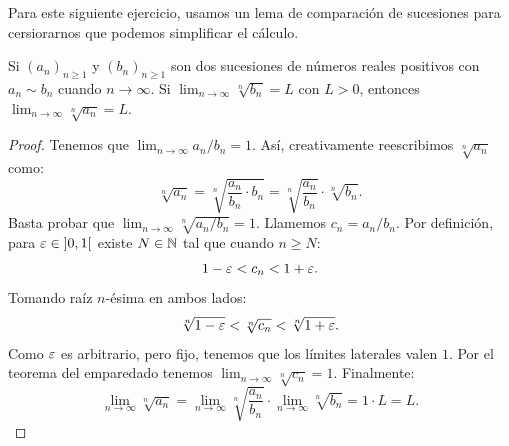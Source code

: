 \documentclass[12pt]{memoir}
\begin{document}
Para este siguiente ejercicio, usamos un lema de comparación de sucesiones para cersiorarnos que podemos simplificar el cálculo.

\begin{Lem}
    Si \((a_n)_{n\geq 1}\) y \((b_n)_{n\geq 1}\) son dos sucesiones de números reales positivos con \(a_n \sim b_n\) cuando \(n\to\infty\). Si \(\lim_{n\to\infty} \sqrt[n]{b_n} = L\) con \(L > 0\), entonces \(\lim_{n\to\infty} \sqrt[n]{a_n} = L\).
\end{Lem}

\begin{proof}
    Tenemos que \(\lim_{n\to\infty} {a_n}/{b_n} = 1\). Así, creativamente reescribimos \(\sqrt[n]{a_n}\) como:
    \[
    \sqrt[n]{a_n} = \sqrt[n]{\frac{a_n}{b_n} \cdot b_n} = \sqrt[n]{\frac{a_n}{b_n}} \cdot \sqrt[n]{b_n}.
    \]
    Basta probar que \(\lim_{n\to\infty} \sqrt[n]{a_n/b_n} = 1\). Llamemos \(c_n = a_n/b_n\). Por definición, para \(\varepsilon \in \left\rbrack0,1\right\lbrack\) existe \(N \in \mathbb{N}\) tal que cuando \(n \geq N\):
    \[
    1 - \varepsilon < c_n < 1 + \varepsilon.
    \]
    Tomando raíz \(n\)-ésima en ambos lados:
    \[
    \sqrt[n]{1 - \varepsilon} < \sqrt[n]{c_n} < \sqrt[n]{1 + \varepsilon}.
    \]
    Como \(\varepsilon\) es arbitrario, pero fijo, tenemos que los límites laterales valen \(1\). Por el teorema del emparedado tenemos \(\lim_{n\to\infty} \sqrt[n]{c_n} = 1\). Finalmente:
    \[
    \lim_{n\to\infty} \sqrt[n]{a_n} = \lim_{n\to\infty} \sqrt[n]{\frac{a_n}{b_n}} \cdot \lim_{n\to\infty} \sqrt[n]{b_n} = 1 \cdot L = L.
    \]
\end{proof}
\end{document}
